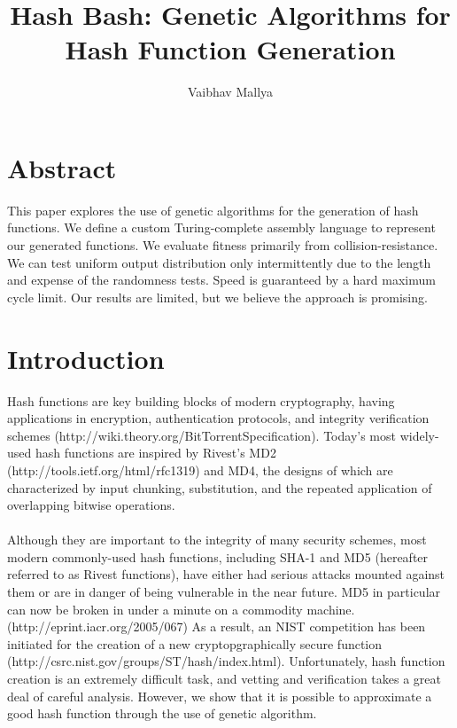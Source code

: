 \documentclass{article}
\begin{document}
\title{Hash Bash: Genetic Algorithms for Hash Function Generation}
\author{Vaibhav Mallya}
\maketitle
\section{Abstract}


This paper explores the use of genetic algorithms for the generation of hash functions. We define a custom Turing-complete assembly language to represent our generated functions. We evaluate fitness primarily from collision-resistance. We can test uniform output distribution only intermittently due to the length and expense of the randomness tests. Speed is guaranteed by a hard maximum cycle limit. Our results are limited, but we believe the approach is promising.

\section{Introduction}
Hash functions are key building blocks of modern cryptography, having applications in encryption, authentication protocols, and integrity verification schemes (http://wiki.theory.org/BitTorrentSpecification). Today's most widely-used hash functions are inspired by Rivest's MD2 (http://tools.ietf.org/html/rfc1319) and MD4, the designs of which are characterized by input chunking, substitution, and the repeated application of overlapping bitwise operations.

\paragraph{}
Although they are important to the integrity of many security schemes, most modern commonly-used hash functions, including SHA-1 and MD5 (hereafter referred to as Rivest functions), have either had serious attacks mounted against them or are in danger of being vulnerable in the near future. MD5 in particular can now be broken in under a minute on a commodity machine. (http://eprint.iacr.org/2005/067) As a result, an NIST competition has been initiated for the creation of a new cryptopgraphically secure function (http://csrc.nist.gov/groups/ST/hash/index.html). Unfortunately, hash function creation is an extremely difficult task, and vetting and verification takes a great deal of careful analysis. However, we show that it is possible to approximate a good hash function through the use of genetic algorithm.
\end{document}
